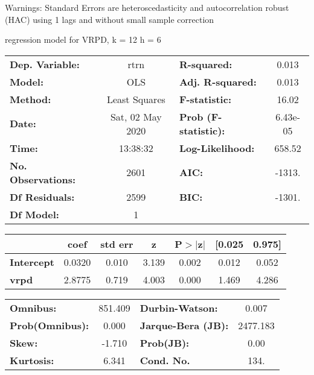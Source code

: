 Warnings: \newline
 [1] Standard Errors are heteroscedasticity and autocorrelation robust (HAC) using 1 lags and without small sample correction\ 

regression model for VRPD, k = 12 h = 6\begin{center}
\begin{tabular}{lclc}
\toprule
\textbf{Dep. Variable:}    &       rtrn       & \textbf{  R-squared:         } &     0.013   \\
\textbf{Model:}            &       OLS        & \textbf{  Adj. R-squared:    } &     0.013   \\
\textbf{Method:}           &  Least Squares   & \textbf{  F-statistic:       } &     16.02   \\
\textbf{Date:}             & Sat, 02 May 2020 & \textbf{  Prob (F-statistic):} &  6.43e-05   \\
\textbf{Time:}             &     13:38:32     & \textbf{  Log-Likelihood:    } &    658.52   \\
\textbf{No. Observations:} &        2601      & \textbf{  AIC:               } &    -1313.   \\
\textbf{Df Residuals:}     &        2599      & \textbf{  BIC:               } &    -1301.   \\
\textbf{Df Model:}         &           1      & \textbf{                     } &             \\
\bottomrule
\end{tabular}
\begin{tabular}{lcccccc}
                   & \textbf{coef} & \textbf{std err} & \textbf{z} & \textbf{P$> |$z$|$} & \textbf{[0.025} & \textbf{0.975]}  \\
\midrule
\textbf{Intercept} &       0.0320  &        0.010     &     3.139  &         0.002        &        0.012    &        0.052     \\
\textbf{vrpd}      &       2.8775  &        0.719     &     4.003  &         0.000        &        1.469    &        4.286     \\
\bottomrule
\end{tabular}
\begin{tabular}{lclc}
\textbf{Omnibus:}       & 851.409 & \textbf{  Durbin-Watson:     } &    0.007  \\
\textbf{Prob(Omnibus):} &   0.000 & \textbf{  Jarque-Bera (JB):  } & 2477.183  \\
\textbf{Skew:}          &  -1.710 & \textbf{  Prob(JB):          } &     0.00  \\
\textbf{Kurtosis:}      &   6.341 & \textbf{  Cond. No.          } &     134.  \\
\bottomrule
\end{tabular}
\end{center}

